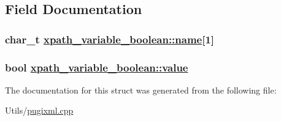 \subsection{Field Documentation}
\hypertarget{structxpath__variable__boolean_2b2cb81ee5c9a19a667428d08d5bb951}{
\subsubsection[name]{\setlength{\rightskip}{0pt plus 5cm}char\_\-t \hyperlink{structxpath__variable__boolean_2b2cb81ee5c9a19a667428d08d5bb951}{xpath\_\-variable\_\-boolean::name}\mbox{[}1\mbox{]}}}
\label{structxpath__variable__boolean_2b2cb81ee5c9a19a667428d08d5bb951}


\hypertarget{structxpath__variable__boolean_b54117a6cced8c3e029724651df4d404}{
\subsubsection[value]{\setlength{\rightskip}{0pt plus 5cm}bool \hyperlink{structxpath__variable__boolean_b54117a6cced8c3e029724651df4d404}{xpath\_\-variable\_\-boolean::value}}}
\label{structxpath__variable__boolean_b54117a6cced8c3e029724651df4d404}




The documentation for this struct was generated from the following file:\begin{CompactItemize}
\item 
Utils/\hyperlink{pugixml_8cpp}{pugixml.cpp}\end{CompactItemize}
